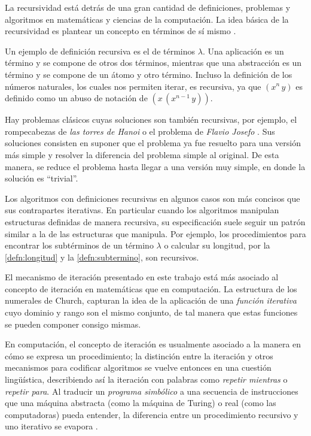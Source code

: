 La recursividad está detrás de una gran cantidad de definiciones, problemas y algoritmos en matemáticas y ciencias de la computación. La idea básica de la recursividad es plantear un concepto en términos de sí mismo \cite{knuth:Concrete}.

Un ejemplo de definición recursiva es el de términos $ λ $. Una aplicación es un término y se compone de otros dos términos, mientras que una abstracción es un término y se compone de un átomo y otro término. Incluso la definición de los números naturales, los cuales nos permiten iterar, es recursiva, ya que $ (x^{n}\, y) $ es definido como un abuso de notación de $ (x\, (x^{n-1}\, y)) $.

Hay problemas clásicos cuyas soluciones son también recursivas, por ejemplo, el rompecabezas de \emph{las torres de Hanoi} o el problema de \emph{Flavio Josefo} \cite{knuth:Concrete}. Sus soluciones consisten en suponer que el problema ya fue resuelto para una versión más simple y resolver la diferencia del problema simple al original. De esta manera, se reduce el problema hasta llegar a una versión muy simple, en donde la solución es ``trivial''.

Los algoritmos con definiciones recursivas en algunos casos son más concisos que sus contrapartes iterativas. En particular cuando los algoritmos manipulan estructuras definidas de manera recursiva, su especificación suele seguir un patrón similar a la de las estructuras que manipula. Por ejemplo, los procedimientos para encontrar los subtérminos de un término $ λ $ o calcular su longitud, por la \autoref{defn:longitud} y la \autoref{defn:subtermino}, son recursivos.

El mecanismo de iteración presentado en este trabajo está más asociado al concepto de iteración en matemáticas que en computación. La estructura de los numerales de Church, capturan la idea de la aplicación de una \emph{función iterativa} cuyo dominio y rango son el mismo conjunto, de tal manera que estas funciones se pueden componer consigo mismas.

En computación, el concepto de iteración es usualmente asociado a la manera en cómo se expresa un procedimiento; la distinción entre la iteración y otros mecanismos para codificar algoritmos se vuelve entonces en una cuestión lingüística, describiendo así la iteración con palabras como \emph{repetir mientras} o \emph{repetir para}. Al traducir un \emph{programa simbólico} a una secuencia de instrucciones que una máquina abstracta (como la máquina de Turing) o real (como las computadoras) pueda entender, la diferencia entre un procedimiento recursivo y uno iterativo se evapora \cite[p.~73]{Aho:Dragon} \cite{Steele:LambdaGOTO}.


